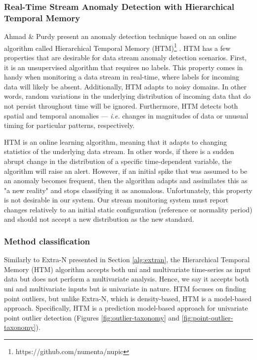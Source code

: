 \subsubsection{Real-Time Stream Anomaly Detection with Hierarchical Temporal Memory}
Ahmad \& Purdy present an anomaly detection technique based on an online algorithm called Hierarchical Temporal Memory (HTM)\footnote{https://github.com/numenta/nupic} \cite{Ahmad-HTM}. HTM has a few properties that are desirable for data stream anomaly detection scenarios. First, it is an unsupervised algorithm that requires no labels. This property comes in handy when monitoring a data stream in real-time, where labels for incoming data will likely be absent. Additionally, HTM adapts to noisy domains. In other words, random variations in the underlying distribution of incoming data that do not persist throughout time will be ignored. Furthermore, HTM detects both spatial and temporal anomalies --- \textit{i.e.} changes in magnitudes of data or unusual timing for particular patterns, respectively.   

HTM is an online learning algorithm, meaning that it adapts to changing statistics of the underlying data stream. In other words, if there is a sudden abrupt change in the distribution of a specific time-dependent variable, the algorithm will raise an alert. However, if an initial spike that was assumed to be an anomaly becomes frequent, then the algorithm adapts and assimilates this as "a new reality" and stops classifying it as anomalous. Unfortunately, this property is not desirable in our system. Our stream monitoring system must report changes relatively to an initial static configuration (reference or normality period) and should not accept a new distribution as the new standard.

\subsubsection*{Method classification}
Similarly to Extra-N presented in Section \ref{alg:extran}, the Hierarchical Temporal Memory (HTM) algorithm accepts both uni and multivariate time-series as input data but does not perform a multivariate analysis. Hence, we say it accepts both uni and multivariate inputs but is univariate in nature. HTM focuses on finding point outliers, but unlike Extra-N, which is density-based, HTM is a model-based approach. Specifically, HTM is a prediction model-based approach for univariate point outlier detection (Figures \ref{fig:outlier-taxonomy} and \ref{fig:point-outlier-taxonomy}).


